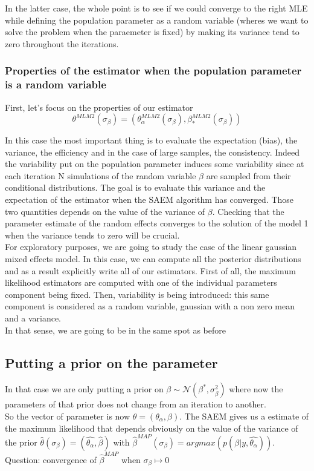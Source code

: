 \documentclass[a4paper]{article}
\begin{document}
In the latter case, the whole point is to see if we could converge to the right MLE while defining the population parameter as a random variable (wheres we want to solve the problem when the paraemeter is fixed) by making its variance tend to zero throughout the iterations.

\subsubsection{Properties of the estimator when the population parameter is a random variable}

First, let's focus on the properties of our estimator 
\begin{equation}
\theta^{ML M2}(\sigma_{\beta}) = (\theta_{\alpha}^{ML M2}(\sigma_{\beta}),\beta_*^{ML M2}(\sigma_{\beta}) )
\end{equation}

In this case the most important thing is to evaluate the expectation (bias), the variance, the efficiency and in the case of large samples, the consistency. Indeed the variability put on the population parameter induces some variability since at each iteration N simulations of the random variable $\beta$ are sampled from their conditional distributions. The goal is to evaluate this variance and the expectation of the estimator when the SAEM algorithm has converged. Those two quantities depends on the value of the variance of $\beta$. Checking that the parameter estimate of the random effects converges to the solution of the model 1 when the variance tends to zero will be crucial.\\

For exploratory purposes, we are going to study the case of the linear gaussian mixed effects model. In this case, we can compute all the posterior distributions and as a result explicitly write all of our estimators. First of all, the maximum likelihood estimators are computed with one of the individual parameters component being fixed. Then, variability is being introduced: this same component is considered as a random variable, gaussian with a non zero mean and a variance.\\

In that sense, we are going to be in the same spot as before

\subsection{Putting a prior on the parameter}
In that case we are only putting a prior on $\beta \sim \mathcal{N}(\beta^{*}, \sigma_{\beta}^2)$ where now the parameters of that prior does not change from an iteration to another.\\
So the vector of parameter is now $\theta = (\theta_{\alpha}, \beta)$. The SAEM gives us a estimate of the maximum likelihood that depends obviously on the value of the variance of the prior $\hat{\theta}(\sigma_{\beta}) = (\hat{\theta_{\alpha}}, \hat{\beta})$ with $\hat{\beta}^{MAP}(\sigma_{\beta})  = arg max (p(\beta | y, \hat{\theta_{\alpha}}))$. \\
Question: convergence of $\hat{\beta}^{MAP}$ when $\sigma_{\beta} \mapsto 0$\\
\end{document}

